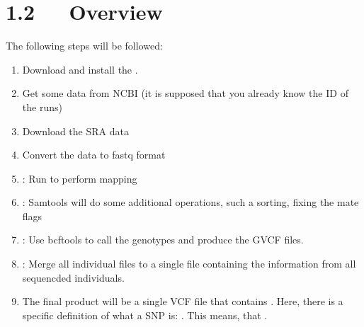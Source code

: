 \documentclass[letterpaper,10pt,english]{sphinxmanual}
\begin{document}
\chapter{1.2   Overview}
\label{\detokenize{index:overview}}
\sphinxAtStartPar
The following steps will be followed:
\begin{enumerate}
%
\item {} 
\sphinxAtStartPar
Download and install the .

\item {} 
\sphinxAtStartPar
Get some data from NCBI (it is supposed that you already know the ID of the runs)

\item {} 
\sphinxAtStartPar
Download the SRA data

\item {} 
\sphinxAtStartPar
Convert the data to fastq format

\item {} 
\sphinxAtStartPar
{}: Run  to perform mapping

\item {} 
\sphinxAtStartPar
{}: Samtools will do some additional operations, such a sorting, fixing the mate flags

\item {} 
\sphinxAtStartPar
{}: Use bcftools to call the genotypes and produce the GVCF files.

\item {} 
\sphinxAtStartPar
{}: Merge all individual files to a single file containing the information from all sequencded individuals.

\item {} 
\sphinxAtStartPar
{}

\sphinxAtStartPar
The final product will be a single VCF file that contains . Here, there is a specific definition of what a SNP is: . This means, that .

\end{enumerate}
\end{document}
